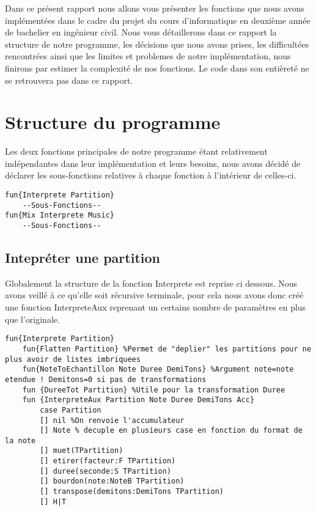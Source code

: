 \documentclass[a4paper,12pt]{report}
\begin{document}
Dans ce présent rapport nous allons vous présenter les fonctions que nous avons implémentées dans le cadre du projet du cours d'informatique en deuxième année de bachelier en ingénieur civil. Nous vous détaillerons dans ce rapport la structure de notre programme, les décisions que nous avons prises, les difficultées rencontrées ainsi que les limites et problemes de notre implémentation, nous finirons par estimer la complexité de nos fonctions. Le code dans son entièreté ne se retrouvera pas dans ce rapport.

\section*{Structure du programme}
Les deux fonctions principales de notre programme étant relativement indépendantes dans leur implémentation et leurs besoins, nous avons décidé de déclarer les sous-fonctions relatives à chaque fonction à l'intérieur de celles-ci.
\begin{lstlisting}[frame=single] 
fun{Interprete Partition}
	--Sous-Fonctions--
fun{Mix Interprete Music}
	--Sous-Fonctions--
\end{lstlisting}

\subsection*{Intepréter une partition}
Globalement la structure de la fonction Interprete est reprise ci dessous. Nous avons veillé à ce qu'elle soit récursive terminale, pour cela nous avons donc créé une fonction InterpreteAux reprenant un certains nombre de paramètres en plus que l'originale. 
\begin{lstlisting}[frame=single] 
fun{Interprete Partition}
	fun{Flatten Partition} %Permet de "deplier" les partitions pour ne plus avoir de listes imbriquees
	fun{NoteToEchantillon Note Duree DemiTons} %Argument note=note etendue ! Demitons=0 si pas de transformations
	fun {DureeTot Partition} %Utile pour la transformation Duree 
	fun {InterpreteAux Partition Note Duree DemiTons Acc}
		case Partition
		[] nil %On renvoie l'accumulateur
		[] Note % decuple en plusieurs case en fonction du format de la note
		[] muet(TPartition)
		[] etirer(facteur:F TPartition)
		[] duree(seconde:S TPartition)
		[] bourdon(note:NoteB TPartition)
		[] transpose(demitons:DemiTons TPartition)
		[] H|T			
\end{lstlisting}
\end{document}
